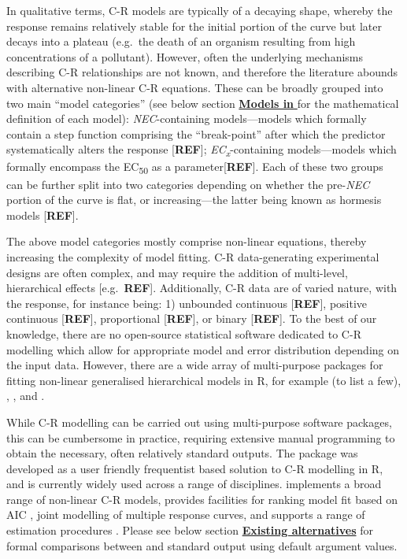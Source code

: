 In qualitative terms, C-R models are typically of a decaying shape,
whereby the response remains relatively stable for the initial portion
of the curve but later decays into a plateau (e.g.~the death of an
organism resulting from high concentrations of a pollutant). However,
often the underlying mechanisms describing C-R relationships are not
known, and therefore the literature abounds with alternative non-linear
C-R equations. These can be broadly grouped into two main ``model
categories'' (see below section \protect\hyperlink{mdbnc}{\textbf{Models
in }} for the mathematical definition of each model):
\emph{NEC}-containing models---models which formally contain a step
function comprising the ``break-point'' after which the predictor
systematically alters the response {[}\textbf{REF}{]};
\emph{EC\textsubscript{x}}-containing models---models which formally
encompass the EC\textsubscript{50} as a parameter{[}\textbf{REF}{]}.
Each of these two groups can be further split into two categories
depending on whether the pre-\emph{NEC} portion of the curve is flat, or
increasing---the latter being known as hormesis models
{[}\textbf{REF}{]}.

The above model categories mostly comprise non-linear equations, thereby
increasing the complexity of model fitting. C-R data-generating
experimental designs are often complex, and may require the addition of
multi-level, hierarchical effects {[}e.g.~\textbf{REF}{]}. Additionally,
C-R data are of varied nature, with the response, for instance being: 1)
unbounded continuous {[}\textbf{REF}{]}, positive continuous
{[}\textbf{REF}{]}, proportional {[}\textbf{REF}{]}, or binary
{[}\textbf{REF}{]}. To the best of our knowledge, there are no
open-source statistical software dedicated to C-R modelling which allow
for appropriate model and error distribution depending on the input
data. However, there are a wide array of multi-purpose packages for
fitting non-linear generalised hierarchical models in R, for example (to
list a few),  \citep{pinheiro2021}, 
\citep{pinheiro2021},  \citep{Su2015} and 
\citep{rstan2021}.

While C-R modelling can be carried out using multi-purpose software
packages, this can be cumbersome in practice, requiring extensive manual
programming to obtain the necessary, often relatively standard outputs.
The  package \citep{Ritz2016} was developed as a user friendly
frequentist based solution to C-R modelling in R, and is currently
widely used across a range of disciplines.  implements a broad
range of non-linear C-R models, provides facilities for ranking model
fit based on AIC \citep{Burnham2002}, joint modelling of multiple
response curves, and supports a range of estimation procedures
\citep{Ritz2016}. Please see below section
\protect\hyperlink{bnchmrk}{\textbf{Existing alternatives}} for formal
comparisons between  and  standard output using
default argument values.

